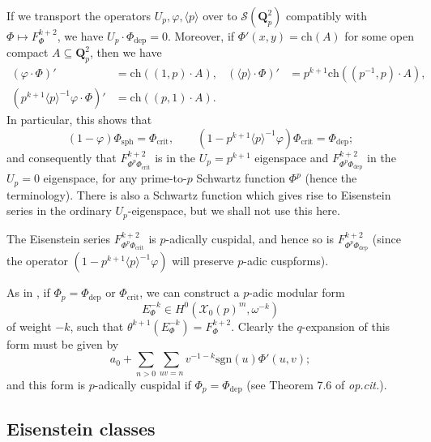 \documentclass[cjm]{ipart}
\theoremstyle{plain}
\theoremstyle{remark}
\DeclareMathOperator{\crit}{crit}
\newcommand{\QQ}{\mathbf{Q}}
\newcommand{\Qp}{\QQ_p}
\newcommand{\cS}{\mathcal{S}}
\newcommand{\cX}{\mathcal{X}}
\newcommand{\ch}{\mathrm{ch}}
\newcommand{\dep}{\mathrm{dep}}
\newcommand{\sgn}{\mathrm{sgn}}
\numberwithin{equation}{subsection}
\begin{document}
\begin{note}
 \label{note:UpEis}
 If we transport the operators $U_p, \varphi, \langle p \rangle$ over to $\cS(\Qp^2)$ compatibly with $\Phi \mapsto F^{k+2}_{\Phi}$, we have $U_p \cdot \Phi_{\dep} = 0$. Moreover, if $\Phi'(x, y) = \ch(A)$ for some open compact $A \subseteq \Qp^2$, then we have
 \begin{align*}
  (\varphi \cdot \Phi)' &= \ch( (1, p) \cdot A), & (\langle p \rangle \cdot \Phi)' &= p^{k+1} \ch( (p^{-1}, p) \cdot A),\\
  (p^{k+1} \langle p \rangle^{-1} \varphi \cdot \Phi)' &= \ch( (p, 1) \cdot A).
 \end{align*}
 In particular, this shows that
 \[ (1 - \varphi) \Phi_{\mathrm{sph}} = \Phi_{\crit},
 \qquad  %
 (1 - p^{k+1} \langle p \rangle^{-1} \varphi) \Phi_{\mathrm{crit}} = \Phi_{\dep}; \]
 and consequently that $F^{k+2}_{\Phi^p \Phi_{\crit}}$ is in the $U_p = p^{k+1}$ eigenspace and $F^{k+2}_{\Phi^p \Phi_{\dep}}$ in the $U_p = 0$ eigenspace, for any prime-to-$p$ Schwartz function $\Phi^p$ (hence the terminology). There is also a Schwartz function which gives rise to Eisenstein series in the ordinary $U_p$-eigenspace, but we shall not use this here.
\end{note}

\begin{note}\label{note:padicallycusp1}
 The Eisenstein series $F^{k+2}_{\Phi^p \Phi_{\crit}}$ is $p$-adically cuspidal, and hence so is $F^{k+2}_{\Phi^p\Phi_{\dep}}$ (since the operator $ (1 - p^{k+1} \langle p \rangle^{-1} \varphi)$ will preserve $p$-adic cuspforms).
\end{note}

As in \cite[\S 7.3]{LPSZ1}, if $\Phi_p = \Phi_{\dep}$ or $\Phi_{\mathrm{crit}}$, we can construct a $p$-adic modular form
\[ E^{-k}_{\Phi} \in H^0(\cX_0(p)^m, \omega^{-k})\]
of weight $-k$, such that $\theta^{k+1}\left(E^{-k}_{\Phi}\right) = F^{k+2}_{\Phi}$. Clearly the $q$-expansion of this form must be given by
\[ a_0 + \sum_{n > 0} \sum_{uv = n} v^{-1-k} \sgn(u) \Phi'(u, v); \]
and this form is $p$-adically cuspidal if $\Phi_p = \Phi_{\dep}$ (see Theorem 7.6 of \emph{op.cit.}).



\subsection{Eisenstein classes}  \label{sect:higherEis}
\end{document}
